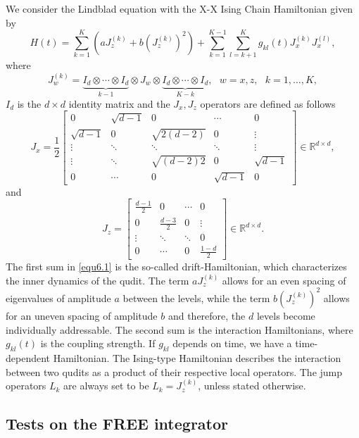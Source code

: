 \documentclass[preprint,3p,compress,12pt]{elsarticle}
\numberwithin{equation}{section}
\numberwithin{figure}{section}
\begin{document}
We consider the Lindblad equation with the X-X Ising Chain Hamiltonian given by
\begin{equation}\label{equ6.1}
  H(t)=\sum_{k=1}^K(aJ_z^{(k)}+b(J_z^{(k)})^2)+\sum_{k=1}^{K-1}\sum_{l=k+1}^Kg_{kl}(t)J_x^{(k)}J_x^{(l)},
\end{equation}
where
\[J_w^{(k)}=\underbrace{I_d\otimes\cdots\otimes I_d}_{k-1}\otimes J_w\otimes \underbrace{I_d\otimes\cdots\otimes I_d}_{K-k},~~~w=x,z,~~~k=1,\ldots,K,\]
$I_d$ is the $d\times d$ identity matrix and the $J_x,J_z$ operators are defined as follows
 \begin{equation*}
J_x=\frac{1}{2}\begin{bmatrix}
  0&\sqrt{d-1}&0&\cdots&0\\
  \sqrt{d-1}&0&\sqrt{2(d-2)}&0&\vdots\\
  \vdots&\ddots&\ddots&\ddots&\vdots\\
  \vdots&\ddots&\sqrt{(d-2)2}&0&\sqrt{d-1}\\
  0&\cdots&0&\sqrt{d-1}&0
\end{bmatrix}\in \mathbb{R}^{d\times d},
 \end{equation*}
 and
 \begin{equation*}
   J_z=\begin{bmatrix}
  \frac{d-1}{2}&0&\cdots&0\\
  0&\frac{d-3}{2}&0&\vdots\\
  \vdots&\ddots&\ddots&0\\
  0&\cdots&0&\frac{1-d}{2}
\end{bmatrix}\in \mathbb{R}^{d\times d}.
 \end{equation*}
The first sum in \eqref{equ6.1} is the so-called drift-Hamiltonian, which characterizes the inner dynamics of the qudit. The term $aJ_z^{(k)}$ allows for an even spacing of eigenvalues of amplitude $a$ between the levels, while the term $b(J_z^{(k)})^2$ allows for an uneven spacing of amplitude $b$ and therefore, the $d$ levels become individually addressable. The second sum is the interaction Hamiltonians, where $g_{kl}(t)$ is the coupling strength. If $g_{kl}$ depends on time, we have a
time-dependent Hamiltonian. The Ising-type Hamiltonian describes the interaction between two qudits as a product of their respective local operators.
The jump operators $L_k$ are always set to be $L_k=J_z^{(k)}$, unless stated otherwise.

\subsection{Tests on the FREE integrator}
\end{document}
